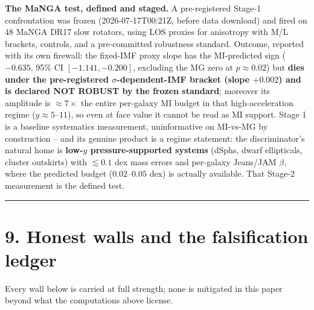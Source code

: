\documentclass[
]{article}
\newcounter{none} %
\begin{document}
\textbf{The MaNGA test, defined and staged.} A pre-registered Stage-1
confrontation was frozen (2026-07-17T00:21Z, before data download) and
fired on 48 MaNGA DR17 slow rotators, using LOS proxies for anisotropy
with M/L brackets, controls, and a pre-committed robustness standard.
Outcome, reported with its own firewall: the fixed-IMF proxy slope has
the MI-predicted sign (\(-0.635\), 95\% CI \([-1.141, -0.200]\),
excluding the MG zero at \(p \approx 0.02\)) but \textbf{dies under the
pre-registered \(\sigma\)-dependent-IMF bracket (slope \(+0.002\)) and
is declared NOT ROBUST by the frozen standard}; moreover its amplitude
is \(\approx 7\times\) the entire per-galaxy MI budget in that
high-acceleration regime (\(y \approx 5\)--\(11\)), so even at face
value it cannot be read as MI support. Stage 1 is a baseline systematics
measurement, uninformative on MI-vs-MG by construction -- and its
genuine product is a regime statement: the discriminator's natural home
is \textbf{low-\(y\) pressure-supported systems} (dSphs, dwarf
ellipticals, cluster outskirts) with \(\lesssim 0.1\) dex mass errors
and per-galaxy Jeans/JAM \(\beta\), where the predicted budget
(\(0.02\)--\(0.05\) dex) is actually available. That Stage-2 measurement
is the defined test.

\begin{center}\rule{0.5\linewidth}{0.5pt}\end{center}

\section{9. Honest walls and the falsification
ledger}\label{honest-walls-and-the-falsification-ledger}

Every wall below is carried at full strength; none is mitigated in this
paper beyond what the computations above license.
\end{document}
